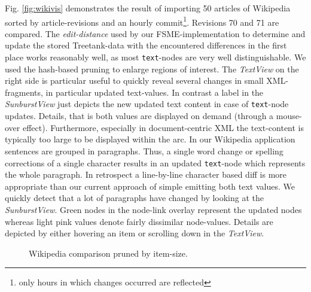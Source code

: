 Fig. \ref{fig:wikivis} demonstrates the result of importing 50 articles of Wikipedia sorted by article-revisions and an hourly commit\footnote{only hours in which changes occurred are reflected}. Revisions 70 and 71 are compared. The \emph{edit-distance} used by our FSME-implementation to determine and update the stored Treetank-data with the encountered differences in the first place works reasonably well, as most \texttt{text}-nodes are very well distinguishable. We used the hash-based pruning to enlarge regions of interest. The \emph{TextView} on the right side is particular useful to quickly reveal several changes in small XML-fragments, in particular updated text-values. In contrast a label in the \emph{SunburstView} just depicts the new updated text content in case of \texttt{text}-node updates. Details, that is both values are displayed on demand (through a mouse-over effect). Furthermore, especially in document-centric XML the text-content is typically too large to be displayed within the arc. In our Wikipedia application sentences are grouped in paragraphs. Thus, a single word change or spelling corrections of a single character results in an updated \texttt{text}-node which represents the whole paragraph. In retrospect a line-by-line character based diff is more appropriate than our current approach of simple emitting both text values. We quickly detect that a lot of paragraphs have changed by looking at the \emph{SunburstView}. Green nodes in the node-link overlay represent the updated nodes whereas light pink values denote fairly dissimilar node-values. Details are depicted by either hovering an item or scrolling down in the \emph{TextView}. %

\begin{figure}[tb]
\caption{\label{fig:wikivis-rev90106} Wikipedia comparison pruned by item-size.}
\end{figure}

